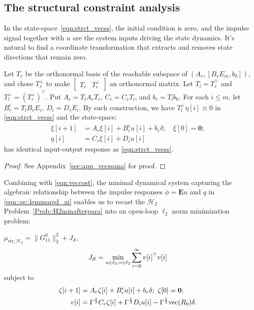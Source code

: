 \subsection{The structural constraint analysis}
In the state-space~\eqref{eqn:strct_vecss}, the initial condition is zero, and the impulse signal together with \(u\) are the system inputs driving the state dynamics. It's natural to find a coordinate transformation that extracts and removes state directions that remain zero. 
\begin{lemma}\label{lemma:redsys}
Let \(T_r\) be the orthonormal basis of the reachable subspace of \((A_v,[B_v E_m,b_0])\), and chose \(T_r^\perp\) to make \(\begin{bmatrix} T_r & T_r^\perp\end{bmatrix}\) an orthonormal matrix. Let \(T_l = T_r^\top\) and \(T_l^\perp = (T_r^\perp)^\top\). Put \(A_r = T_l A_v T_r\), \(C_r = C_v T_l\), and \(b_r = T_l b_0\). For each \(i\leq m\), let \(B_r^i = T_l B_v E_i,\ D_i = D_v E_i\). By such construction, we have \(T_l^\perp \eta[i] \equiv 0\) in \eqref{eqn:strct_vecss} and the state-space:
\begin{equation}\label{eqn::ss::lemmared_xi}
\begin{split}
    \xi[i+1] & =A_r \xi[i] + B_r^i u[i] + b_r \delta;\quad \xi[0] =\mathbf{0};\\
    q[i] &= C_r \xi[i] +D_i u[i]
\end{split}
\end{equation}
has identical input-output response as \eqref{eqn:strct_vecss}. 
\end{lemma}
\begin{proof}
See Appendix~\ref{sec:app_vecssana} for proof.    
\end{proof}
Combining with \eqref{eqn:veccost}, the minimal dynamical system capturing the algebraic relationship between the impulse responses \(\phi = \mathbf{E} u \) and \(q\) in \eqref{eqn::ss::lemmared_xi} enables us to recast the \(\mathcal{H}_2\) Problem~\ref{Prob::H2minafterpara} into an open-loop \(\ell_2\) norm minimization problem: 
\begin{opt}\label{Prob::H2min_ssqp}
\(\mu_{\mathrm{str}, \mathcal{H}_2} = \|G_{11}^0\|_2^2 + J_\mathcal{S}\),
\begin{equation}
     J_\mathcal{S} = \underset{u\in\ell_2, v\in\ell_2}{\min} \sum_{i=0}^{\infty} v[i]^\top v[i]\\
\end{equation}
subject to
\begin{equation}\label{eqn::ss::reduced2norm}
\begin{split}
    \zeta[i+1] &=A_r \zeta[i] + B_r^i u[i] + b_r \delta; \ \zeta[0] =\mathbf{0};\\
    v[i] &= \Gamma^{\frac{1}{2}} C_r \zeta[i] + \Gamma^{\frac{1}{2}} D_i u[i] -\Gamma^{\frac{1}{2}}{\mathrm{vec}}(R_0)\delta.\\
\end{split}
\end{equation}
\end{opt}
